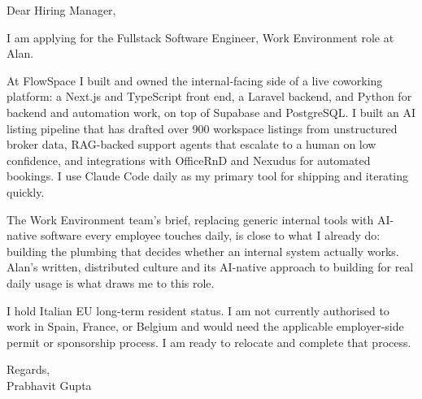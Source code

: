 \documentclass[a4paper,11pt]{article}
\begin{document}
Dear Hiring Manager,

I am applying for the Fullstack Software Engineer, Work Environment role at Alan.

At FlowSpace I built and owned the internal-facing side of a live coworking platform: a Next.js and TypeScript front end, a Laravel backend, and Python for backend and automation work, on top of Supabase and PostgreSQL. I built an AI listing pipeline that has drafted over 900 workspace listings from unstructured broker data, RAG-backed support agents that escalate to a human on low confidence, and integrations with OfficeRnD and Nexudus for automated bookings. I use Claude Code daily as my primary tool for shipping and iterating quickly.

The Work Environment team's brief, replacing generic internal tools with AI-native software every employee touches daily, is close to what I already do: building the plumbing that decides whether an internal system actually works. Alan's written, distributed culture and its AI-native approach to building for real daily usage is what draws me to this role.

I hold Italian EU long-term resident status. I am not currently authorised to work in Spain, France, or Belgium and would need the applicable employer-side permit or sponsorship process. I am ready to relocate and complete that process.

Regards,\\
Prabhavit Gupta
\end{document}
